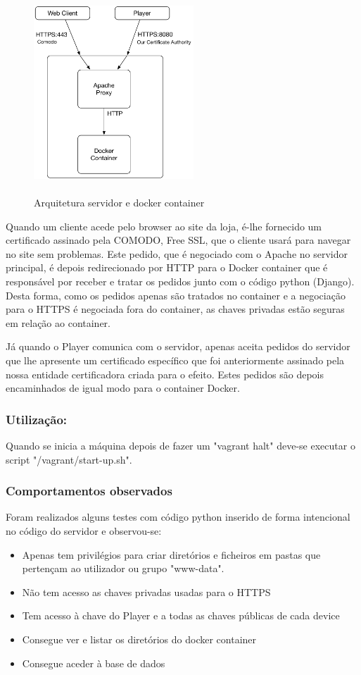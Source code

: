 \documentclass[pdftex,12pt,a4paper]{report}
\begin{document}
\begin{figure}[!htb]
\center
 \includegraphics[width=60mm,scale=1]{docker.pdf}
 \caption{\\Arquitetura servidor e docker container}
 \label{fig:docker_c}
\end{figure}

Quando um cliente acede pelo browser ao site da loja, é-lhe fornecido um certificado assinado pela COMODO, Free SSL, que o cliente usará para navegar no site sem problemas. Este pedido, que é negociado com o Apache no servidor principal, é depois redirecionado por HTTP para o Docker container que é responsável por receber e tratar os pedidos junto com o código python (Django). Desta forma, como os pedidos apenas são tratados no container e a negociação para o HTTPS é negociada fora do container, as chaves privadas estão seguras em relação ao container.

Já quando o Player comunica com o servidor, apenas aceita pedidos do servidor que lhe apresente um certificado específico que foi anteriormente assinado pela nossa entidade certificadora criada para o efeito. Estes pedidos são depois encaminhados de igual modo para o container Docker.

\subsubsection{Utilização:}
Quando se inicia a máquina depois de fazer um "vagrant halt" deve-se executar o script "/vagrant/start-up.sh". 

\subsubsection{Comportamentos observados}
Foram realizados alguns testes com código python inserido de forma intencional no código do servidor e observou-se:

\begin{itemize}
\item Apenas tem privilégios para criar diretórios e ficheiros em pastas que pertençam ao utilizador ou grupo "www-data".
\item Não tem acesso as chaves privadas usadas para o HTTPS
\item Tem acesso à chave do Player e a todas as chaves públicas de cada device
\item Consegue ver e listar os diretórios do docker container
\item Consegue aceder à base de dados
\end{itemize}
\end{document}
